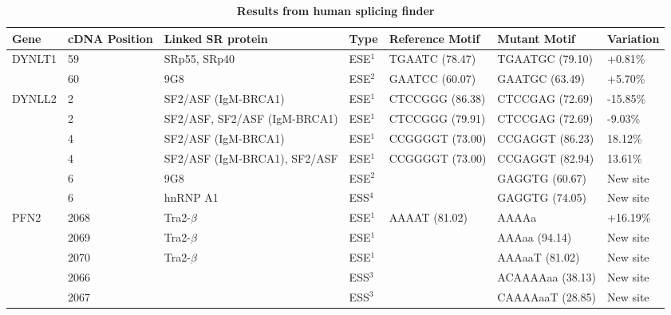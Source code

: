 \documentclass[10pt]{article}
\begin{document}
\begin{table}[!ht]
\caption{
\bf{Results from human splicing finder}}
\begin{tabular}{lp{1cm}p{3cm}llll}
\hline
Gene &  cDNA Position & Linked SR protein & Type & Reference Motif & Mutant Motif & Variation \\
\hline
DYNLT1 & 59 & SRp55, SRp40 & ESE$^{1}$& TGAATC (78.47) & TGAATGC (79.10) & +0.81\% \\
& 60 & 9G8 & ESE$^{2}$ & GAATCC (60.07) & GAATGC (63.49) & +5.70\% \\
\hline
DYNLL2 & 2 & SF2/ASF (IgM-BRCA1) & ESE$^{1}$ & CTCCGGG (86.38) & CTCCGAG (72.69) & -15.85\% \\
& 2 & SF2/ASF, SF2/ASF (IgM-BRCA1) & ESE$^{1}$ & CTCCGGG (79.91) & CTCCGAG (72.69) & -9.03\% \\
& 4 & SF2/ASF (IgM-BRCA1) & ESE$^{1}$& CCGGGGT (73.00) & CCGAGGT (86.23) & 18.12\% \\
& 4 & SF2/ASF (IgM-BRCA1), SF2/ASF & ESE$^{1}$ & CCGGGGT (73.00) & CCGAGGT (82.94) & 13.61\% \\
& 6 & 9G8 & ESE$^{2}$ & & GAGGTG (60.67) & New site \\
& 6 & hnRNP A1 & ESS$^{4}$& & GAGGTG (74.05) & New site \\
\hline
PFN2 & 2068 & Tra2-$\beta$ & ESE$^{1}$ & AAAAT (81.02) & AAAAa & +16.19\% \\
& 2069 & Tra2-$\beta$ & ESE$^{1}$ & & AAAaa (94.14) & New site \\
& 2070 & Tra2-$\beta$ & ESE$^{1}$ & & AAAaaT (81.02) & New site \\
 & 2066 & & ESS$^{3}$ & & ACAAAAaa (38.13) & New site \\
 & 2067 & & ESS$^{3}$ & & CAAAAaaT (28.85) & New site \\
\hline


\end{tabular}
\end{table}
\end{document}
